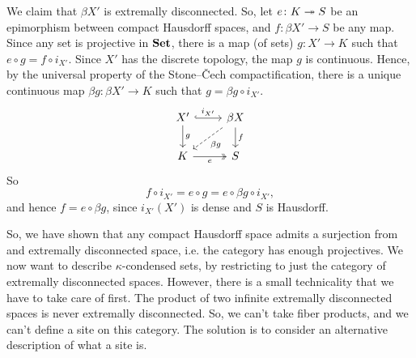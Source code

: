 \documentclass{article}
\begin{document}
We claim that $\beta X'$ is extremally disconnected.
So, let $e \colon K \twoheadrightarrow S$ be an epimorphism between compact Hausdorff spaces,
and $f\colon \beta X' \to S$ be any map.
Since any set is projective in $\operatorname{\mathbf{Set}}$, there is a map (of sets)
$g \colon X' \to K$ such that $e\circ g = f \circ i_{X'}$.
Since $X'$ has the discrete topology, the map $g$ is continuous.
Hence, by the universal property of the Stone--\v{C}ech compactification,
there is a unique continuous map $\beta g \colon \beta X' \to K$ such that
$g = \beta g \circ i_{X'}$.
\begin{equation*}
    \begin{tikzcd}
        X' \rar[hook, "i_{X'}"] \dar["g"] & \beta X \dar["f"] \ar[ld, dashed, "\beta g"] \\
        K \rar[two heads, "e"'] & S
    \end{tikzcd}
\end{equation*}
So
\begin{equation*}
    f \circ i_{X'} = e \circ g = e \circ \beta g \circ i_{X'},
\end{equation*}
and hence $f = e \circ \beta g$, since $i_{X'}(X')$ is dense
and $S$ is Hausdorff.

So, we have shown that any compact Hausdorff space admits a surjection from
and extremally disconnected space, i.e. the category has enough projectives.
We now want to describe $\kappa$-condensed sets, by restricting to
just the category of extremally disconnected spaces. However, there is a small
technicality that we have to take care of first. The product of two
infinite extremally disconnected spaces is never extremally disconnected. So,
we can't take fiber products, and we can't define a site
on this category. The solution is to consider an alternative description
of what a site is.
\end{document}
